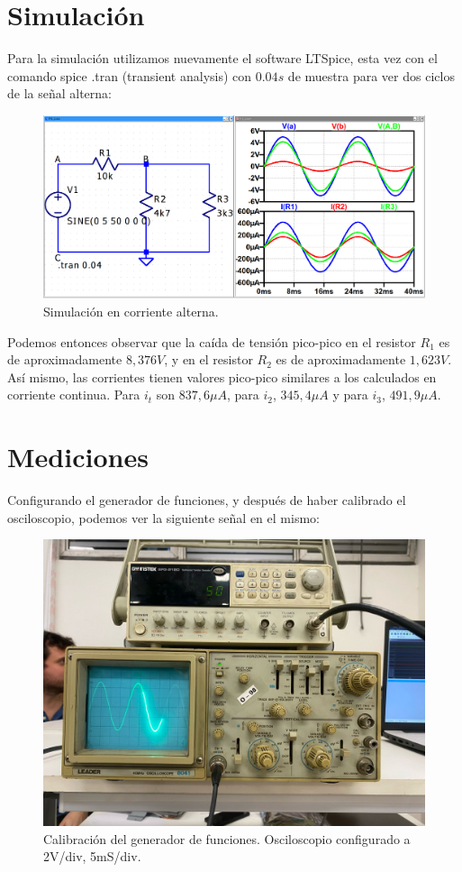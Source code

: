 \documentclass[a4paper,12pt, spanish]{report}
\begin{document}
      \section{Simulación}
      Para la simulación utilizamos nuevamente el software LTSpice, esta vez con el comando spice .tran (transient
      analysis) con $0.04s$ de muestra para ver dos ciclos de la señal alterna:
      \begin{figure}[!h]
        \centering
        \includegraphics[width=1\linewidth]{images/sim_ac.png}
        \caption{Simulación en corriente alterna.}
      \end{figure}

      Podemos entonces observar que la caída de tensión pico-pico en el resistor $R_1$ es de aproximadamente $8,376V$,
      y en el resistor $R_2$ es de aproximadamente $1,623V$. Así mismo, las corrientes tienen valores pico-pico
      similares a los calculados en corriente continua. Para $i_t$ son $837,6\mu A$, para $i_2$, $345,4\mu A$ y para
      $i_3$, $491,9\mu A$.

      \newpage
      \section{Mediciones}
      Configurando el generador de funciones, y después de haber calibrado el osciloscopio, podemos ver la siguiente
      señal en el mismo:
      \begin{figure}[!h]
        \centering
        \includegraphics[width=0.8\linewidth]{pictures/osc-ac_vs.jpeg}
        \caption{Calibración del generador de funciones. Osciloscopio configurado a 2V/div, 5mS/div.}
      \end{figure}
\end{document}
